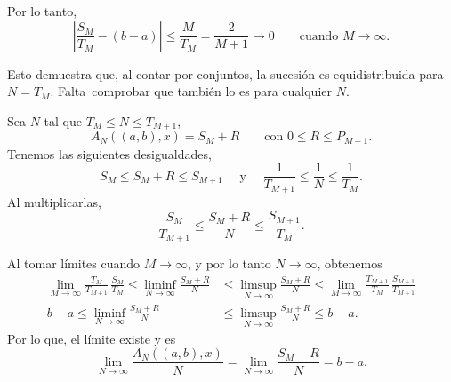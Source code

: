 \begin{resolve}
    Por lo tanto, 
    \[
        \left| \frac{S_M}{T_M} - (b-a) \right| \leq
        \frac{M}{T_M} = \frac{2}{M+1} \longrightarrow 0 \qquad \text{cuando } M \to \infty.
    \]
    
    Esto demuestra que, al contar por conjuntos, la sucesión es equidistribuida para $N = T_M$.
    Falta~comprobar que también lo es para cualquier $N$. 

    Sea $N$ tal que $T_M \leq N \leq T_{M+1}$,
    \[
        A_N((a,b), x) = S_M + R \qquad \text{con } 0 \leq R \leq P_{M+1}.
    \]
    Tenemos las siguientes desigualdades,
    \[
        S_M \leq S_M + R \leq S_{M+1} 
        \quad \text{ y } \quad
        \frac{1}{T_{M+1}} \leq \frac{1}{N} \leq \frac{1}{T_M}.
    \]
    Al multiplicarlas,
    \[
        \frac{S_M}{T_{M+1}} \leq \frac{S_M + R}{N} \leq \frac{S_{M+1}}{T_M}.
    \]
    
    Al tomar límites cuando $M \to \infty$, y por lo tanto $N \to \infty$, obtenemos
    \begin{align*}
        \lim_{M \to \infty} \frac{T_M}{T_{M+1}} \, \frac{S_M}{T_M} \leq
        \liminf_{N \to \infty} \frac{S_M + R}{N} &\leq
        \limsup_{N \to \infty} \frac{S_M + R}{N} \leq
        \lim_{M \to \infty} \frac{T_{M+1}}{T_M} \, \frac{S_{M+1}}{T_{M+1}}  \\
        b-a \leq
        \liminf_{N \to \infty} \frac{S_M + R}{N} &\leq
        \limsup_{N \to \infty} \frac{S_M + R}{N} \leq
        b-a.
    \end{align*}
    Por lo que, el límite existe y es
    \[
        \lim_{N \to \infty} \frac{A_N((a,b), x)}{N} =
        \lim_{N \to \infty} \frac{S_M + R}{N} = 
        b-a.
    \]
\end{resolve}